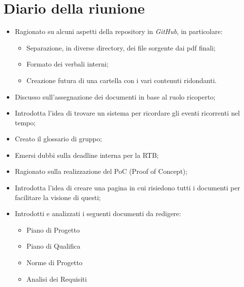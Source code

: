 \section{Diario della riunione}
\begin{itemize}
  \item Ragionato su alcuni aspetti della repository in \textit{GitHub}, in particolare:
  \begin{itemize}
    \item Separazione, in diverse directory, dei file sorgente dai pdf finali;
    \item Formato dei verbali interni;
    \item Creazione futura di una cartella con i vari contenuti ridondanti.
  \end{itemize}
  \item Discusso sull'assegnazione dei documenti in base al ruolo ricoperto;
  \item Introdotta l'idea di trovare un sistema per ricordare gli eventi ricorrenti nel tempo;
  \item Creato il glossario di gruppo;
  \item Emersi dubbi sulla deadline interna per la RTB;
  \item Ragionato sulla realizzazione del PoC (Proof of Concept);
  \item Introdotta l'idea di creare una pagina in cui risiedono tutti i documenti per facilitare la visione di questi;
  \item Introdotti e analizzati i seguenti documenti da redigere:
  \begin{itemize}
    \item Piano di Progetto
    \item Piano di Qualifica
    \item Norme di Progetto
    \item Analisi dei Requisiti
  \end{itemize}
\end{itemize}
